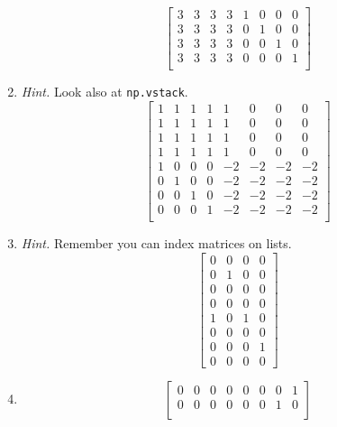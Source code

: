 \documentclass{article}
\theoremstyle{remark}
\begin{document}
\begin{enumerate}
\begin{displaymath}
    \begin{bmatrix}
      3 & 3 & 3 & 3 & 1 & 0 & 0 & 0 \\
      3 & 3 & 3 & 3 & 0 & 1 & 0 & 0\\
      3 & 3 & 3 & 3 & 0 & 0 & 1 & 0\\
      3 & 3 & 3 & 3 & 0 & 0 & 0 & 1 \\
    \end{bmatrix}
  \end{displaymath}
\item \textit{Hint.} Look also at \texttt{np.vstack}.
  \begin{displaymath}
    \begin{bmatrix}
      1 & 1 & 1 & 1 & 1 & 0 & 0 & 0 \\
      1 & 1 & 1 & 1 & 1 & 0 & 0 & 0 \\
      1 & 1 & 1 & 1 & 1 & 0 & 0 & 0 \\
      1 & 1 & 1 & 1 & 1 & 0 & 0 & 0 \\
      1 & 0 & 0 & 0 & -2 & -2 & -2 & -2 \\
      0 & 1 & 0 & 0 & -2 & -2 & -2 & -2 \\
      0 & 0 & 1 & 0 & -2 & -2 & -2 & -2 \\
      0 & 0 & 0 & 1 & -2 & -2 & -2 & -2 \\
    \end{bmatrix}
  \end{displaymath}
\item \textit{Hint.} Remember you can index matrices on lists.
  \begin{displaymath}
    \begin{bmatrix}
      0 & 0 & 0 & 0 \\
      0 & 1 & 0 & 0 \\
      0 & 0 & 0 & 0 \\
      0 & 0 & 0 & 0 \\
      1 & 0 & 1 & 0 \\
      0 & 0 & 0 & 0 \\
      0 & 0 & 0 & 1 \\
      0 & 0 & 0 & 0
    \end{bmatrix}
  \end{displaymath}
\item
  \begin{displaymath}
    \begin{bmatrix}
      0 & 0 & 0 & 0 & 0 & 0 & 0 & 1 \\
      0 & 0 & 0 & 0 & 0 & 0 & 1 & 0 \\

\end{bmatrix}
\end{displaymath}
\end{enumerate}
\end{document}
